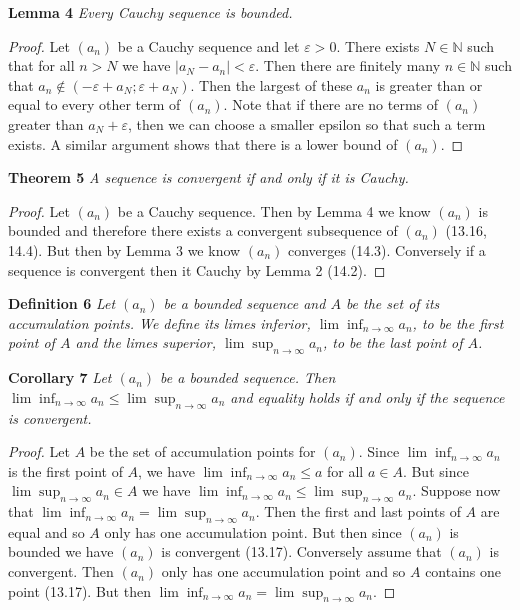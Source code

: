 \documentclass{article}
\begin{document}
\begin{flushleft}
\textbf{Lemma 4}
\textsl{Every Cauchy sequence is bounded.}
\begin{proof}
Let $(a_n)$ be a Cauchy sequence and let $\varepsilon > 0$. There exists $N \in \mathbb{N}$ such that for all $n > N$ we have $|a_N - a_n| < \varepsilon$. Then there are finitely many $n \in \mathbb{N}$ such that $a_n \notin (-\varepsilon + a_N ; \varepsilon + a_N)$. Then the largest of these $a_n$ is greater than or equal to every other term of $(a_n)$. Note that if there are no terms of $(a_n)$ greater than $a_N + \varepsilon$, then we can choose a smaller epsilon so that such a term exists. A similar argument shows that there is a lower bound of $(a_n)$.
\end{proof}

\textbf{Theorem 5}
\textsl{A sequence is convergent if and only if it is Cauchy.}
\begin{proof}
Let $(a_n)$ be a Cauchy sequence. Then by Lemma 4 we know $(a_n)$ is bounded and therefore there exists a convergent subsequence of $(a_n)$ (13.16, 14.4). But then by Lemma 3 we know $(a_n)$ converges (14.3). Conversely if a sequence is convergent then it Cauchy by Lemma 2 (14.2).
\end{proof}

\textbf{Definition 6}
\textsl{Let $(a_n)$ be a bounded sequence and $A$ be the set of its accumulation points. We define its limes inferior, $\lim \inf_{n \rightarrow \infty} a_n$, to be the first point of $A$ and the limes superior, $\lim \sup_{n \rightarrow \infty} a_n$, to be the last point of $A$.}\newline

\textbf{Corollary 7}
\textsl{Let $(a_n)$ be a bounded sequence. Then $\lim \inf_{n \rightarrow \infty} a_n \leq 
\lim \sup_{n \rightarrow \infty} a_n$ and equality holds if and only if the sequence is convergent.}
\begin{proof}
Let $A$ be the set of accumulation points for $(a_n)$. Since $\lim \inf_{n \rightarrow \infty} a_n$ is the first point of $A$, we have $\lim \inf_{n \rightarrow \infty} a_n \leq a$ for all $a \in A$. But since $\lim \sup_{n \rightarrow \infty} a_n \in A$ we have $\lim \inf_{n \rightarrow \infty} a_n \leq \lim \sup_{n \rightarrow \infty} a_n$. Suppose now that $\lim \inf_{n \rightarrow \infty} a_n = \lim \sup_{n \rightarrow \infty} a_n$. Then the first and last points of $A$ are equal and so $A$ only has one accumulation point. But then since $(a_n)$ is bounded we have $(a_n)$ is convergent (13.17). Conversely assume that $(a_n)$ is convergent. Then $(a_n)$ only has one accumulation point and so $A$ contains one point (13.17). But then $\lim \inf_{n \rightarrow \infty} a_n = \lim \sup_{n \rightarrow \infty} a_n$.
\end{proof}


\end{flushleft}
\end{document}
